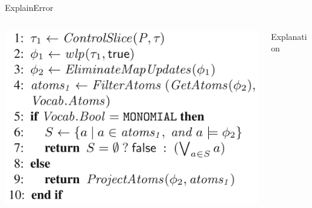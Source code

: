 \documentclass[11pt]{beamer}
\begin{document}
\begin{frame}{ExplainError}
\begin{columns}

\begin{column}{0.5\textwidth}
\includegraphics[width=0.9\linewidth]{img/explainErrorShort.png}
\end{column}

\begin{column}{0.5\textwidth}
Explanation
\end{column}

\end{columns}
\end{frame}
\end{document}
